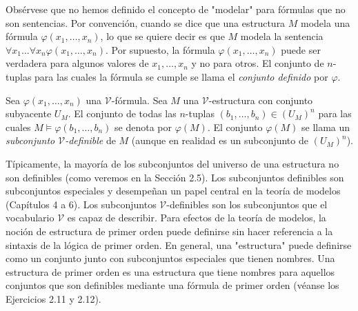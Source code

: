 \message{ !name(main.tex)}\documentclass[12pt,a4paper]{book}
\newcommand{\comillas}[1]{"#1"}
\newcommand{\VV}{\mathcal{V}}
\begin{document}
    Obsérvese que no hemos definido el concepto de \comillas{modelar} para fórmulas que no son sentencias. Por convención,
    cuando se dice que una estructura $M$ modela una fórmula $\varphi(x_{1},\dots,x_{n})$, lo que se quiere decir es que $M$
    modela la sentencia $\forall x_{1}\dots\forall x_{n}\varphi(x_{1},\dots,x_{n})$. Por supuesto, la fórmula
    $\varphi(x_{1},\dots,x_{n})$ puede ser verdadera para algunos valores de $x_{1},\dots,x_{n}$ y no para otros. El
    conjunto de $n$-tuplas para las cuales la fórmula se cumple se llama el \textit{conjunto definido} por $\varphi$.

    \begin{definicion}\label{def:conjunto-definible}
        Sea $\varphi(x_{1},\dots,x_{n})$ una $\VV$-fórmula. Sea $M$ una $\VV$-estructura con conjunto subyacente $U_{M}$. El
        conjunto de todas las $n$-tuplas $(b_{1},\dots,b_{n})\in(U_{M})^{n}$ para las cuales $M\models\varphi(b_{1},\dots,b_{n})$
        se denota por $\varphi(M)$. El conjunto $\varphi(M)$ se llama un \textit{subconjunto $\VV$-definible} de $M$ (aunque
        en realidad es un subconjunto de $(U_{M})^{n}$).
    \end{definicion}

    Típicamente, la mayoría de los subconjuntos del universo de una estructura no son definibles (como veremos en la
    Sección 2.5). Los subconjuntos definibles son subconjuntos especiales y desempeñan un papel central en la teoría de
    modelos (Capítulos 4 a 6). Los subconjuntos $\VV$-definibles son los subconjuntos que el vocabulario $\VV$ es capaz de
    describir. Para efectos de la teoría de modelos, la noción de estructura de primer orden puede definirse sin hacer
    referencia a la sintaxis de la lógica de primer orden. En general, una \comillas{estructura} puede definirse como un
    conjunto junto con subconjuntos especiales que tienen nombres. Una estructura de primer orden es una estructura que
    tiene nombres para aquellos conjuntos que son definibles mediante una fórmula de primer orden (véanse los Ejercicios
    2.11 y 2.12).
\end{document}
